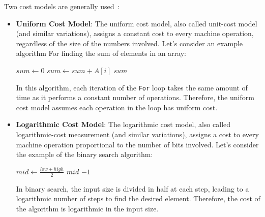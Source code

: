 \documentclass[12pt]{book} %
\begin{document}
Two cost models are generally used~\cite{AhoHopcroft1974, Hromkovič2004, Ausiello1999, Wegener20, Tarjan1983}:
\begin{itemize}
    \item 
    \textbf{Uniform Cost Model}:
    The uniform cost model, also called unit-cost model (and similar variations), assigns a constant cost to every machine operation, regardless of the size of the numbers involved. 
    \newline
    Let's consider an example algorithm For finding the sum of elements in an array: 

    \begin{algorithm}[H]
    \caption{Sum of Array Elements}
    \begin{algorithmic}[1]
        \State $sum \gets 0$
            \State $sum \gets sum + A[i]$
        \EndFor
        \State \Return $sum$
    \EndFunction
    \end{algorithmic}
    \end{algorithm}

    In this algorithm, each iteration of the \texttt{For} loop takes the same amount of time as it performs a constant number of operations. Therefore, the uniform cost model assumes each operation in the loop has uniform cost.

    \item 
    \textbf{Logarithmic Cost Model}:
    The logarithmic cost model, also called logarithmic-cost measurement (and similar variations), assigns a cost to every machine operation proportional to the number of bits involved. 
    \newline
    Let's consider the example of the binary search algorithm:

    \begin{algorithm}[H]
    \caption{Binary Search}
    \begin{algorithmic}[1]
            \State $mid \gets \frac{low + high}{2}$
                \State \Return $mid$
                \State \Return {}
            \Else
                \State \Return {}
            \EndIf
        \EndIf
        \State \Return $-1$
    \EndFunction
    \end{algorithmic}
    \end{algorithm}

    In binary search, the input size is divided in half at each step, leading to a logarithmic number of steps to find the desired element. Therefore, the cost of the algorithm is logarithmic in the input size.
\end{itemize}
\end{document}
